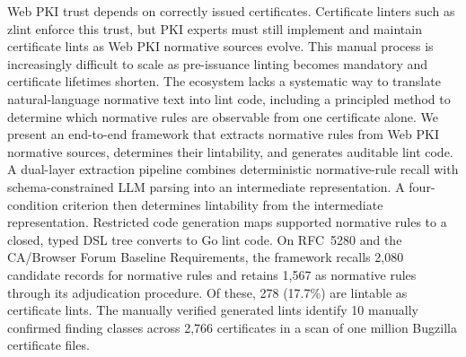 Web PKI trust depends on correctly issued certificates. Certificate
linters such as zlint enforce this trust, but PKI experts must still implement
and maintain certificate lints as Web PKI normative sources evolve. This manual process
is increasingly difficult to scale as pre-issuance linting becomes mandatory and
certificate lifetimes shorten. The ecosystem lacks a systematic way to translate
natural-language normative text into lint code, including a principled method to
determine which normative rules are observable from one certificate alone. We present an
end-to-end framework that extracts normative rules from Web PKI normative sources,
determines their lintability, and generates auditable lint code. A dual-layer
extraction pipeline combines deterministic normative-rule recall with
schema-constrained LLM parsing into an intermediate
representation. A four-condition criterion then determines lintability from
the intermediate representation. Restricted code
generation maps supported normative rules to a closed, typed DSL tree converts to Go lint code. On RFC~5280 and the CA/Browser Forum Baseline Requirements, the framework
recalls 2,080 candidate records for normative rules and retains 1,567 as normative rules through its
adjudication procedure. Of these,
278 (17.7\%) are lintable as certificate lints. The manually verified generated lints identify 10 manually confirmed
finding classes across 2,766 certificates in a scan of one million Bugzilla
certificate files.
